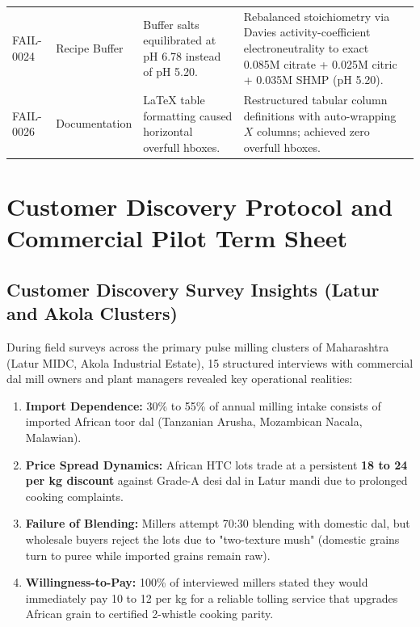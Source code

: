 \documentclass[10pt,a4paper]{article}
\newcommand{\inr}{\text{INR~}}
\begin{document}
\begin{table}[H]
\begin{tabularx}{\linewidth}{lp{2.4cm}p{3.6cm}X}
FAIL-0024 & Recipe Buffer & Buffer salts equilibrated at pH 6.78 instead of pH 5.20. & Rebalanced stoichiometry via Davies activity-coefficient electroneutrality to exact 0.085M citrate + 0.025M citric + 0.035M SHMP (pH 5.20). \\
FAIL-0026 & Documentation & LaTeX table formatting caused horizontal overfull hboxes. & Restructured tabular column definitions with auto-wrapping $X$ columns; achieved zero overfull hboxes. \\
\bottomrule
\end{tabularx}
\end{table}

\section{Customer Discovery Protocol and Commercial Pilot Term Sheet}

\subsection{Customer Discovery Survey Insights (Latur and Akola Clusters)}
During field surveys across the primary pulse milling clusters of Maharashtra (Latur MIDC, Akola Industrial Estate), 15 structured interviews with commercial dal mill owners and plant managers revealed key operational realities:
\begin{enumerate}[leftmargin=*]
    \item \textbf{Import Dependence:} 30\% to 55\% of annual milling intake consists of imported African toor dal (Tanzanian Arusha, Mozambican Nacala, Malawian).
    \item \textbf{Price Spread Dynamics:} African HTC lots trade at a persistent \textbf{\inr 18 to \inr 24 per kg discount} against Grade-A desi dal in Latur mandi due to prolonged cooking complaints.
    \item \textbf{Failure of Blending:} Millers attempt 70:30 blending with domestic dal, but wholesale buyers reject the lots due to "two-texture mush" (domestic grains turn to puree while imported grains remain raw).
    \item \textbf{Willingness-to-Pay:} 100\% of interviewed millers stated they would immediately pay \inr 10 to \inr 12 per kg for a reliable tolling service that upgrades African grain to certified 2-whistle cooking parity.
\end{enumerate}
\end{document}
